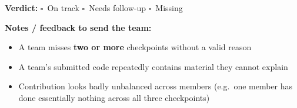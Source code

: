 \documentclass[11pt]{article}
\newcommand{\ybox}{$\square$\ }
\begin{document}
\textbf{Verdict:} \ybox On track \quad \ybox Needs follow-up \quad \ybox Missing

\medskip
\textbf{Notes / feedback to send the team:}\\[28pt]

\begin{rulebox}
\begin{itemize}[leftmargin=*,nosep]
  \item A team misses \textbf{two or more} checkpoints without a valid reason
  \item A team's submitted code repeatedly contains material they cannot explain
  \item Contribution looks badly unbalanced across members (e.g.\ one member has done
        essentially nothing across all three checkpoints)
\end{itemize}
\end{rulebox}
\end{document}
